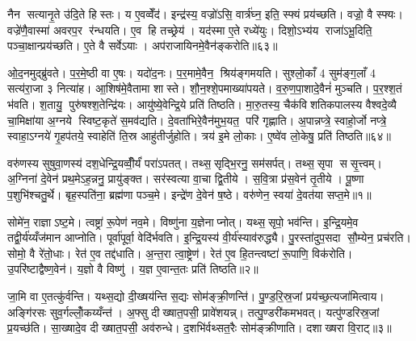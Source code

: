 नैन सत्यानृ॒ते उ॑दि॒ते हिस्तः। य ए॒वव्वेँद॑। इन्द्र॑स्य॒ वज्रो॑ऽसि॒ वार्त्र॑घ्न॒ इति॒ स्फ्यं प्रय॑च्छति। वज्रो॒ वै स्फ्यः। वज्रे॑णै॒वास्मा॑ अवरप॒र र॑न्धयति। ए॒व हि तच्छ्रेय॑। यद॑स्मा ए॒ते रध्ये॑युः। दिशो॒ऽभ्य॑य राजा॑ऽभू॒दिति॒ पञ्चा॒क्षान्प्रय॑च्छति। ए॒ते वै सर्वेऽयाः। अप॑राजायिनमे॒वैन॑ङ्करोति॥६३॥

ओ॒द॒नमुद्ब्रु॑वते। प॒र॒मे॒ष्ठी वा ए॒षः। यदो॑द॒नः। प॒र॒मामे॒वैन॒ श्रिय॑ङ्गमयति। सुश्लो॒काँ 4 सुम॑ङ्ग॒लाँ 4 सत्य॑रा॒जा ३ नित्या॑ह। आ॒शिष॑मे॒वैतामा शास्ते। शौ॒न॒श्शे॒पमाख्या॑पयते। व॒रु॒ण॒पा॒शादे॒वैनं॑ मुञ्चति। प॒र॒श्श॒तं भ॑वति। श॒तायु॒ पुरु॑षश्श॒तेन्द्रि॑यः। आयु॑ष्ये॒वेन्द्रि॒ये प्रति॑ तिष्ठति। मा॒रु॒तस्य॒ चैक॑विशतिकपालस्य वैश्वदे॒व्यै चा॒मिक्षा॑या अ॒ग्नये स्विष्ट॒कृते॑ स॒मव॑द्यति। दे॒वता॑भिरे॒वैन॑मुभ॒यत॒ परि॑ गृह्णाति। अ॒पान्नप्त्रे॒ स्वाहो॒र्जो नप्त्रे॒ स्वाहा॒ऽग्नये॑ गृ॒हप॑तये॒ स्वाहेति॑ ति॒स्र आहु॑तीर्जुहोति। त्रय॑ इ॒मे लो॒काः। ए॒ष्वे॑व लो॒केषु॒ प्रति॑ तिष्ठति॥६४॥



\clearpage
{}
\setcounter{anuvakam}{0}
वरु॑णस्य सुषुवा॒णस्य॑ दश॒धेन्द्रि॒यव्वीँ॒र्यं॑ परा॑ऽपतत्। तथ्स॒सृद्भि॒रनु॒ सम॑सर्पत्। तथ्स॒सृपा ससृ॒त्त्वम्। अ॒ग्निना॑ दे॒वेन॑ प्रथ॒मेऽह॒न्ननु॒ प्रायु॑ङ्क्त। सर॑स्वत्या वा॒चा द्वि॒तीये। स॒वि॒त्रा प्र॑स॒वेन॑ तृ॒तीये। पू॒ष्णा प॒शुभि॑श्चतु॒र्थे। बृह॒स्पति॑ना॒ ब्रह्म॑णा पञ्च॒मे। इन्द्रे॑ण दे॒वेन॑ ष॒ष्ठे। वरु॑णेन॒ स्वया॑ दे॒वत॑या सप्त॒मे॥१॥

सोमे॑न॒ राज्ञाऽष्ट॒मे। त्वष्ट्रा॑ रू॒पेण॑ नव॒मे। विष्णु॑ना य॒ज्ञेनाप्नोत्। यथ्स॒सृपो॒ भव॑न्ति। इ॒न्द्रि॒यमे॒व तद्वी॒र्य॑य्यँज॑मान आप्नोति। पूर्वा॑पूर्वा॒ वेदि॑र्भवति। इ॒न्द्रि॒यस्य॑ वी॒र्य॑स्याव॑रुद्ध्यै। पु॒रस्ता॑दुप॒सदा सौ॒म्येन॒ प्रच॑रति। सोमो॒ वै रे॑तो॒धाः। रेत॑ ए॒व तद्द॑धाति। अ॒न्त॒रा त्वा॒ष्ट्रेण॑। रेत॑ ए॒व हि॒तन्त्वष्टा॑ रू॒पाणि॒ विक॑रोति। उ॒परि॑ष्टाद्वैष्ण॒वेन॑। य॒ज्ञो वै विष्णु॑। य॒ज्ञ ए॒वान्त॒तः प्रति॑ तिष्ठति॥२॥\anuvakamend[स॒प्त॒मे द॑धाति॒ पञ्च॑ च]

जा॒मि वा ए॒तत्कु॑र्वन्ति। यथ्स॒द्यो दी॒ख्षय॑न्ति स॒द्यः सोम॑ङ्क्री॒णन्ति॑। पु॒ण्ड॒रि॒स्र॒जां प्रय॑च्छ॒त्यजा॑मित्वाय। अङ्गि॑रसः सुव॒र्गल्लोँ॒कय्यँन्त॑। अ॒फ्सु दीख्षात॒पसी॒ प्रावे॑शयन्न्। तत्पु॒ण्डरी॑कमभवत्। यत्पु॑ण्डरिस्र॒जां प्र॒यच्छ॑ति। सा॒ख्षादे॒व दीख्षात॒पसी॒ अव॑रुन्धे। द॒शभि॑र्वथ्सत॒रैः सोम॑ङ्क्रीणाति। दशाख्षरा वि॒राट्॥३॥

